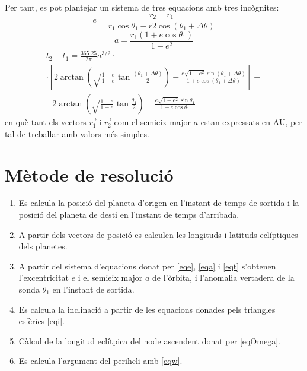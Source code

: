 Per tant, es pot plantejar un sistema de tres equacions amb tres incògnites:
\begin{equation}
e=\frac{r_{2}-r_{1}}{r_{1}\cos\theta_{1}-r{2}\cos\left(\theta_{1}+\Delta\theta\right)}
\label{eqe}
\end{equation}
\begin{equation}
a=\frac{r_{1}\left(1+e\cos\theta_{1}\right)}{1-e^{2}}
\label{eqa}
\end{equation}
\begin{multline}
	t_{2}-t_{1}=\frac{365.25}{2\pi}a^{3/2}\cdot \\
	\cdot\left[2\arctan\left(\sqrt{\frac{1-e}{1+e}}\tan\frac{\left(\theta_{1}+\Delta\theta\right)}{2}\right)-\frac{e\sqrt{1-e^{2}}\sin\left(\theta_{1}+\Delta\theta\right)}{1+e\cos\left(\theta_{1}+\Delta\theta\right)}\right]- \\
	-2\arctan\left(\sqrt{\frac{1-e}{1+e}}\tan\frac{\theta_{1}}{2}\right)-\frac{e\sqrt{1-e^{2}}\sin\theta_{1}}{1+e\cos\theta_{1}}
	\label{eqt}
\end{multline}
en què tant els vectors $\vec{r_{1}}$ i $\vec{r_{2}}$ com el semieix major $a$ estan expressats en AU, per tal de treballar amb valors més simples.

\section{Mètode de resolució}
\begin{enumerate}
	\item Es calcula la posició del planeta d'origen en l'instant de temps de sortida i la posició del planeta de destí en l'instant de temps d'arribada.
	\item A partir dels vectors de posició es calculen les longituds i latituds eclíptiques dels planetes.
	\item A partir del sistema d'equacions donat per \ref{eqe}, \ref{eqa} i \ref{eqt} s'obtenen l'excentricitat $e$ i el semieix major $a$ de l'òrbita, i l'anomalia vertadera de la sonda $\theta_{1}$ en l'instant de sortida.
	\item Es calcula la inclinació a partir de les equacions donades pels triangles esfèrics \ref{eqi}.
	\item Càlcul de la longitud eclítpica del node ascendent donat per \ref{eqOmega}.
	\item Es calcula l'argument del periheli amb \ref{eqw}.
\end{enumerate}